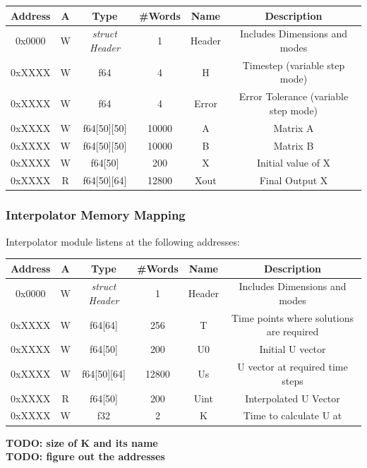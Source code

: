 \documentclass[12pt]{extarticle}
\begin{document}
\begin{center}
 \begin{tabular}{||c c c c c c||} 
 \hline
 Address & A & Type & \#Words & Name & Description  \\ [0.5ex] 
 \hline\hline
  0x0000 & W & \emph{struct Header} & 1 & Header & Includes Dimensions and modes  \\ 
 \hline
 0xXXXX  & W & f64 & 4 & H & Timestep (variable step mode)  \\
 \hline
 0xXXXX  & W & f64 & 4 & Error & Error Tolerance (variable step mode) \\
 \hline
 0xXXXX  & W & f64[50][50] & 10000 & A & Matrix A \\
 \hline
 0xXXXX  & W & f64[50][50] & 10000 & B & Matrix B \\
 \hline
 0xXXXX  & W & f64[50] & 200 & X & Initial value of X \\
 \hline
 0xXXXX  & R & f64[50][64] & 12800 & Xout & Final Output X \\ [1ex] 
 \hline
\end{tabular}
\end{center}

\subsubsection{Interpolator Memory Mapping}
Interpolator module listens at the following addresses:

\begin{center}
 \begin{tabular}{||c c c c c c||} 
 \hline
 Address & A & Type & \#Words & Name & Description  \\ [0.5ex] 
 \hline\hline
  0x0000 & W & \emph{struct Header} & 1 & Header & Includes Dimensions and modes  \\ 
 \hline
 0xXXXX  & W & f64[64] & 256 & T & Time points where solutions are required  \\
 \hline
 0xXXXX  & W & f64[50] & 200 & U0 & Initial U vector \\
 \hline
 0xXXXX  & W & f64[50][64] & 12800 & Us & U vector at required time steps \\
 \hline
 0xXXXX  & R & f64[50] & 200 & Uint & Interpolated U Vector \\
 \hline
 0xXXXX  & W & f32 & 2 & K & Time to calculate U at \\ [1ex] 
 \hline
\end{tabular}
\end{center}
\textbf{TODO: size of K and its name} \\
\textbf{TODO: figure out the addresses}
\end{document}
